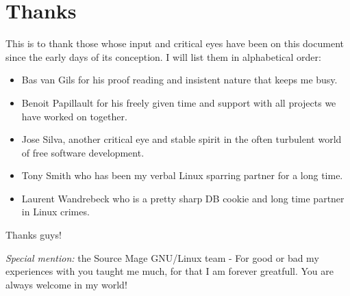 \newpage
\section{Thanks}
This is to thank those whose input and critical eyes have been on this
document since the early days of its conception. I will list them in
alphabetical order:

\begin{itemize}
	\item Bas van Gils for his proof reading and insistent nature that keeps me busy.
\item Benoit Papillault for his freely given time and support with all projects we have worked on together.
\item Jose Silva, another critical eye and stable spirit in the often turbulent world of free software development.
\item Tony Smith who has been my verbal Linux sparring partner for a long time.
\item Laurent Wandrebeck who is a pretty sharp DB cookie and long time partner in Linux crimes.
\end{itemize}

Thanks guys!

\emph{Special mention:} the Source Mage GNU/Linux team - For good or bad my experiences with you 
taught me much, for that I am forever greatfull. You are always welcome in my world!
\newpage
